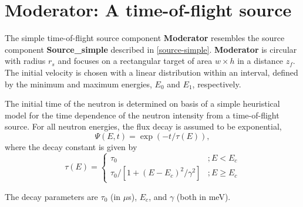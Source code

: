 \section{Moderator: A time-of-flight source}
\label{s:moderator}


The simple time-of-flight source component {\bf Moderator} resembles
the source component {\bf Source\_simple} described in \ref{source-simple}.
{\bf Moderator} is circular with radius $r_s$ and focuses
on a rectangular target of area $w \times h$ in a distance $z_f$. 
The initial velocity is chosen
with a linear distribution within an interval, defined by the
minimum and maximum energies, $E_0$ and $E_1$, respectively.

The initial time of the neutron is determined on basis of a 
simple heuristical model for the time dependence of the
neutron intensity from a time-of-flight source.
For all neutron energies, the flux decay is assumed to be exponential,
\begin{equation}
\Psi(E,t) = \exp(-t/\tau(E)) ,
\end{equation}
where the decay constant is given by
\begin{equation}
\tau(E) = \left\{
\begin{array}{cc}
 \tau_0                               & ; E<E_c \\
 \tau_0 / [ 1 + (E-E_c)^2/\gamma^2 ]  & ; E \geq E_c
\end{array}
\right.
\end{equation}

The decay parameters are
$\tau_0$ (in $\mu$s), $E_c$, and $\gamma$ (both in meV).